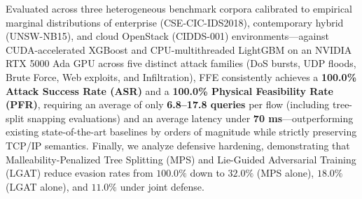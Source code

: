 \documentclass[pdflatex,sn-mathphys-num]{sn-jnl}
\theoremstyle{thmstyleone}
\theoremstyle{thmstyletwo}
\theoremstyle{thmstylethree}
\begin{document}
{Evaluated across three heterogeneous benchmark corpora calibrated to empirical marginal distributions of enterprise (CSE-CIC-IDS2018), contemporary hybrid (UNSW-NB15), and cloud OpenStack (CIDDS-001) environments---against CUDA-accelerated XGBoost and CPU-multithreaded LightGBM on an NVIDIA RTX 5000 Ada GPU across five distinct attack families (DoS bursts, UDP floods, Brute Force, Web exploits, and Infiltration), FFE consistently achieves a \textbf{100.0\% Attack Success Rate (ASR)} and a \textbf{100.0\% Physical Feasibility Rate (PFR)}, requiring an average of only \textbf{6.8--17.8 queries} per flow (including tree-split snapping evaluations) and an average latency under \textbf{70 ms}---outperforming existing state-of-the-art baselines by orders of magnitude while strictly preserving TCP/IP semantics. Finally, we analyze defensive hardening, demonstrating that Malleability-Penalized Tree Splitting (MPS) and Lie-Guided Adversarial Training (LGAT) reduce evasion rates from $100.0\%$ down to $32.0\%$ (MPS alone), $18.0\%$ (LGAT alone), and $11.0\%$ under joint defense.
}


\maketitle




\FloatBarrier


\FloatBarrier



\FloatBarrier
\end{document}
